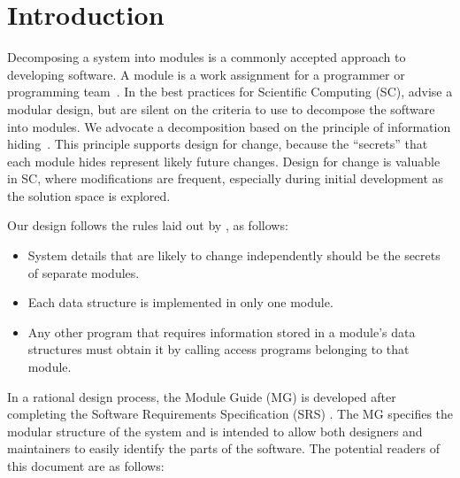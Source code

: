 \documentclass[12pt, titlepage]{article}
\begin{document}
\newpage

\tableofcontents

\listoftables

\listoffigures

\newpage


\section{Introduction}

\hspace{3ex}Decomposing a system into modules is a commonly accepted
approach to developing software.  A module is a work assignment for a
programmer or programming team~\citep{ParnasEtAl1984}.  In the best
practices for Scientific Computing (SC), \citet{WilsonEtAl2013} advise a
modular design, but are silent on the criteria to use to decompose the
software into modules.  We advocate a decomposition based on the
principle of information hiding~\citep{Parnas1972a}.  This principle
supports design for change, because the ``secrets'' that each module
hides represent likely future changes.  Design for change is valuable
in SC, where modifications are frequent, especially during initial
development as the solution space is explored.

Our design follows the rules laid out by \citet{ParnasEtAl1984}, as follows:
\begin{itemize}  
\item System details that are likely to change independently should be
  the secrets of separate modules.
\item Each data structure is implemented in only one module.
\item Any other program that requires information stored in a module's
  data structures must obtain it by calling access programs belonging
  to that module.
\end{itemize}

In a rational design process, the Module Guide (MG) is developed after 
completing the Software Requirements Specification (SRS) 
\citep{ParnasEtAl1984}. The MG specifies the modular
structure of the system and is intended to allow both designers and
maintainers to easily identify the parts of the software.  The
potential readers of this document are as follows:
\end{document}
